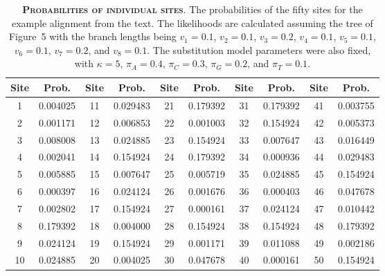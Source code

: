 \documentclass{svmult}
\begin{document}
\begin{table}[b]
\centering
\caption{\textbf{\textsc{Probabilities of individual sites}}.
The probabilities of the fifty sites for the example alignment from the text. The likelihoods are calculated assuming the tree
of Figure~5 with the branch lengths being $v_1 = 0.1$, $v_2 = 0.1$, $v_3 = 0.2$, $v_4 = 0.1$, $v_5 = 0.1$, $v_6 = 0.1$,
$v_7 = 0.2$, and $v_8 = 0.1$. The substitution model parameters were also fixed, with 
$\kappa = 5$, $\pi_A = 0.4$, $\pi_C = 0.3$, $\pi_G = 0.2$, and $\pi_T = 0.1$.}
\begin{tabular}{cccccccccc}
Site  & Prob.               & Site        & Prob.               & Site        & Prob.              & Site        & Prob.               & Site        & Prob.              \\ \hline
1	&	0.004025	&	11	&	0.029483	&	21	&	0.179392	&	31	&	0.179392	&	41	&	0.003755 \\
2	&	0.001171	&	12	&	0.006853	&	22	&	0.001003	&	32	&	0.154924	&	42	&	0.005373 \\
3	&	0.008008	&	13	&	0.024885	&	23	&	0.154924	&	33	&	0.007647	&	43	&	0.016449 \\
4	&	0.002041	&	14	&	0.154924	&	24	&	0.179392	&	34	&	0.000936	&	44	&	0.029483 \\
5	&	0.005885	&	15	&	0.007647	&	25	&	0.005719	&	35	&	0.024885	&	45	&	0.154924 \\
6	&	0.000397	&	16	&	0.024124	&	26	&	0.001676	&	36	&	0.000403	&	46	&	0.047678 \\
7	&	0.002802	&	17	&	0.154924	&	27	&	0.000161	&	37	&	0.024124	&	47	&	0.010442 \\
8	&	0.179392	&	18	&	0.004000	&	28	&	0.154924	&	38	&	0.154924	&	48	&	0.179392 \\
9	&	0.024124	&	19	&	0.154924	&	29	&	0.001171	&	39	&	0.011088	&	49	&	0.002186 \\
10	&	0.024885	&	20	&	0.004025	&	30	&	0.047678	&	40	&	0.000161	&	50	&	0.154924 \\ \hline
\end{tabular}
\label{tab1}
\end{table}
\end{document}
